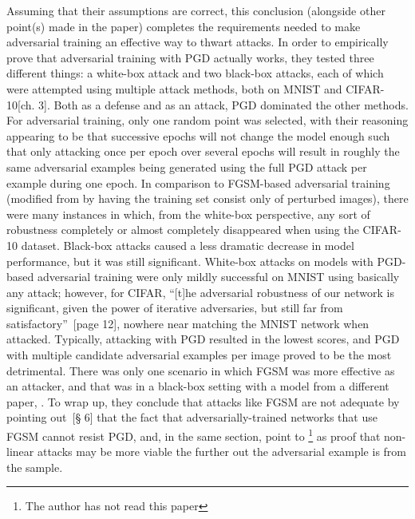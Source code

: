 Assuming that their assumptions are correct, this conclusion (alongside other point(s) made in the
paper) completes the requirements needed to make adversarial training an effective way to thwart
attacks. In order to empirically prove that adversarial training with PGD actually works, they
tested three different things: a white-box attack and two black-box attacks, each of which were
attempted using multiple attack methods, both on MNIST\cite{lecun} and CIFAR-10\cite{cifar}[ch. 3].
Both as a defense and as an attack, PGD dominated the other methods. For adversarial training, only
one random point was selected, with their reasoning appearing to be that successive epochs will not
change the model enough such that only attacking once per epoch over several epochs will result in
roughly the same adversarial examples being generated using the full PGD attack per example during
one epoch. In comparison to FGSM-based adversarial training (modified from
\cite{goodfellow2015explaining} by having the training set consist only of perturbed images), there
were many instances in which, from the white-box perspective, any sort of robustness completely or
almost completely disappeared when using the CIFAR-10 dataset. Black-box attacks caused a less
dramatic decrease in model performance, but it was still significant. White-box attacks on models
with PGD-based adversarial training were only mildly successful on MNIST using basically any attack;
however, for CIFAR, ``[t]he adversarial robustness of our network is significant, given the power of
iterative adversaries, but still far from satisfactory''~\cite{madry2019deep}[page 12], nowhere near
matching the MNIST network when attacked. Typically, attacking with PGD resulted in the lowest
scores, and PGD with multiple candidate adversarial examples per image proved to be the most
detrimental. There was only one scenario in which FGSM was more effective as an attacker, and that
was in a black-box setting with a model from a different paper, \cite{tramèr2017space}. To wrap up,
they conclude that attacks like FGSM are not adequate by pointing out~\cite{madry2019deep}[§ 6] that
the fact that adversarially-trained networks that use FGSM cannot resist PGD, and, in the same
section, point to \cite{tramèr2017space}\footnote{The author has not read this paper} as proof that
non-linear attacks may be more viable the further out the adversarial example is from the sample.
